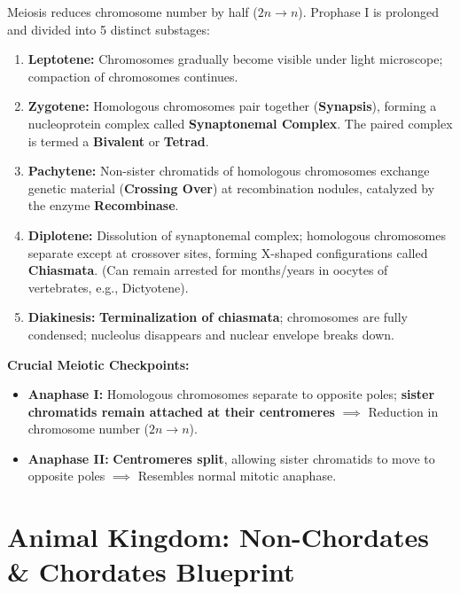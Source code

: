 \documentclass[10pt,a4paper]{article}
\begin{document}
\begin{conceptbox}
Meiosis reduces chromosome number by half ($2n \to n$). Prophase I is prolonged and divided into 5 distinct substages:
\begin{enumerate}
  \item \textbf{Leptotene:} Chromosomes gradually become visible under light microscope; compaction of chromosomes continues.
  \item \textbf{Zygotene:} Homologous chromosomes pair together (\textbf{Synapsis}), forming a nucleoprotein complex called \textbf{Synaptonemal Complex}. The paired complex is termed a \textbf{Bivalent} or \textbf{Tetrad}.
  \item \textbf{Pachytene:} Non-sister chromatids of homologous chromosomes exchange genetic material (\textbf{Crossing Over}) at recombination nodules, catalyzed by the enzyme \textbf{Recombinase}.
  \item \textbf{Diplotene:} Dissolution of synaptonemal complex; homologous chromosomes separate except at crossover sites, forming X-shaped configurations called \textbf{Chiasmata}. (Can remain arrested for months/years in oocytes of vertebrates, e.g., Dictyotene).
  \item \textbf{Diakinesis:} \textbf{Terminalization of chiasmata}; chromosomes are fully condensed; nucleolus disappears and nuclear envelope breaks down.
\end{enumerate}
\textbf{Crucial Meiotic Checkpoints:}
\begin{itemize}
  \item \textbf{Anaphase I:} Homologous chromosomes separate to opposite poles; \textbf{sister chromatids remain attached at their centromeres} $\implies$ Reduction in chromosome number ($2n \to n$).
  \item \textbf{Anaphase II:} \textbf{Centromeres split}, allowing sister chromatids to move to opposite poles $\implies$ Resembles normal mitotic anaphase.
\end{itemize}
\end{conceptbox}

\section{Animal Kingdom: Non-Chordates \& Chordates Blueprint}
\end{document}
